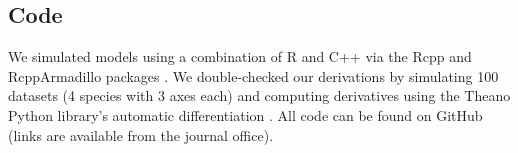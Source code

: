 


\subsection*{Code}

We simulated models using a combination of R \citep{RCoreTeam:2019wf} and
C++ via the Rcpp and RcppArmadillo packages
\citep{Eddelbuettel:2014ad,Eddelbuettel:2013if,Sanderson:2016cs}.
We double-checked our derivations by simulating 100 datasets
(4 species with 3 axes each) and computing derivatives using the Theano Python
library's automatic differentiation \citep{TheanoDevelopmentTeam:2016uc}.
All code can be found on GitHub
(links are available from the journal office).

